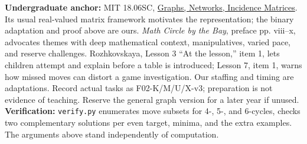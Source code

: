 \documentclass[12pt]{extarticle}
\begin{document}
\textbf{Undergraduate anchor:} MIT 18.06SC, \href{https://ocw.mit.edu/courses/18-06sc-linear-algebra-fall-2011/pages/ax-b-and-the-four-subspaces/graphs-networks-incidence-matrices/}{Graphs, Networks, Incidence Matrices}. Its usual real-valued matrix framework motivates the representation; the binary adaptation and proof above are ours.
\emph{Math Circle by the Bay}, preface pp. viii--x, advocates themes with deep mathematical context, manipulatives, varied pace, and reserve challenges. Rozhkovskaya, Lesson 3 ``At the lesson,'' item 1, lets children attempt and explain before a table is introduced; Lesson 7, item 1, warns how missed moves can distort a game investigation. Our staffing and timing are adaptations. Record actual tasks as F02-K/M/U/X-v3; preparation is not evidence of teaching. Reserve the general graph version for a later year if unused.
\textbf{Verification:} \texttt{verify.py} enumerates move subsets for 4-, 5-, and 6-cycles, checks two complementary solutions per even target, minima, and the extra examples. The arguments above stand independently of computation.
\end{document}
